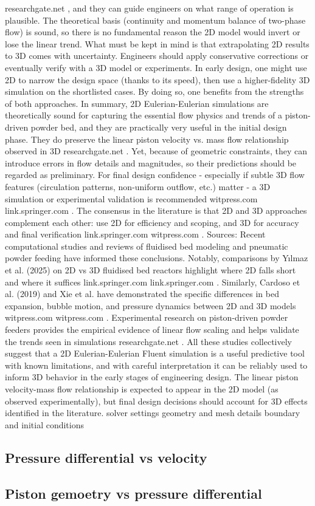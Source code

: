 researchgate.net
, and they can guide engineers on what range of operation is plausible. The theoretical basis (continuity and momentum balance of two-phase flow) is sound, so there is no fundamental reason the 2D model would invert or lose the linear trend. What must be kept in mind is that extrapolating 2D results to 3D comes with uncertainty. Engineers should apply conservative corrections or eventually verify with a 3D model or experiments. In early design, one might use 2D to narrow the design space (thanks to its speed), then use a higher-fidelity 3D simulation on the shortlisted cases. By doing so, one benefits from the strengths of both approaches. In summary, 2D Eulerian-Eulerian simulations are theoretically sound for capturing the essential flow physics and trends of a piston-driven powder bed, and they are practically very useful in the initial design phase. They do preserve the linear piston velocity vs. mass flow relationship observed in 3D
researchgate.net
. Yet, because of geometric constraints, they can introduce errors in flow details and magnitudes, so their predictions should be regarded as preliminary. For final design confidence - especially if subtle 3D flow features (circulation patterns, non-uniform outflow, etc.) matter - a 3D simulation or experimental validation is recommended
witpress.com
link.springer.com
. The consensus in the literature is that 2D and 3D approaches complement each other: use 2D for efficiency and scoping, and 3D for accuracy and final verification
link.springer.com
witpress.com
. Sources: Recent computational studies and reviews of fluidised bed modeling and pneumatic powder feeding have informed these conclusions. Notably, comparisons by Yılmaz et al. (2025) on 2D vs 3D fluidised bed reactors highlight where 2D falls short and where it suffices
link.springer.com
link.springer.com
. Similarly, Cardoso et al. (2019) and Xie et al. have demonstrated the specific differences in bed expansion, bubble motion, and pressure dynamics between 2D and 3D models
witpress.com
witpress.com
. Experimental research on piston-driven powder feeders provides the empirical evidence of linear flow scaling and helps validate the trends seen in simulations
researchgate.net
. All these studies collectively suggest that a 2D Eulerian-Eulerian Fluent simulation is a useful predictive tool with known limitations, and with careful interpretation it can be reliably used to inform 3D behavior in the early stages of engineering design. The linear piston velocity-mass flow relationship is expected to appear in the 2D model (as observed experimentally), but final design decisions should account for 3D effects identified in the literature.
solver settings
geometry and mesh details
boundary and initial conditions

\newpage
\subsection{Pressure differential vs velocity}

\subsection{Piston gemoetry vs pressure differential}
